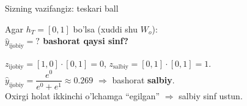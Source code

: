 \documentclass[aspectratio=169,11pt]{beamer}
\begin{document}
\begin{frame}{Sizning vazifangiz: teskari ball}
  \begin{tcolorbox}[warnbox,title=Savol --- 60 soniya]
    \small
    Agar $h_T=[0,1]$ bo'lsa (xuddi shu $W_o$):\\[4pt]
    \textbf{\large $\hat{y}_{\text{ijobiy}} = ?$ \quad bashorat qaysi sinf?}
  \end{tcolorbox}
  \pause
  \begin{tcolorbox}[okbox,title=Javob]
    \small
    $z_{\text{ijobiy}}=[1,0]\cdot[0,1]=0$, \; $z_{\text{salbiy}}=[0,1]\cdot[0,1]=1$.\\[3pt]
    $\hat{y}_{\text{ijobiy}} = \dfrac{e^0}{e^0+e^1} \approx \mathbf{0.269}$
    $\Rightarrow$ bashorat \textbf{salbiy}.\\[3pt]
    \footnotesize Oxirgi holat ikkinchi o'lchamga ``egilgan'' $\Rightarrow$ salbiy
    sinf ustun.
  \end{tcolorbox}
\end{frame}
\end{document}
